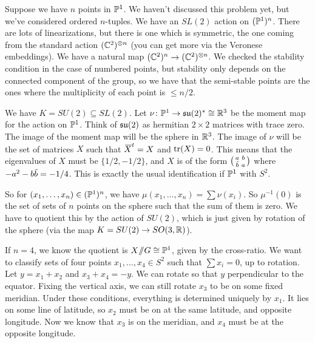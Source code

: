 
\begin{example}
 Suppose we have $n$ points in $\mathbb{P}^1$. We haven't discussed this problem yet, but we've considered ordered $n$-tuples. We have an $SL(2)$ action on $(\mathbb{P}^1)^n$. There are lots of linearizations, but there is one which is symmetric, the one coming from the standard action $(\mathbb{C}^2)^{\otimes n}$ (you can get more via the Veronese embeddings). We have a natural map $(\mathbb{C}^2)^n\to (\mathbb{C}^2)^{\otimes n}$. We checked the stability condition in the case of numbered points, but stability only depends on the connected component of the group, so we have that the semi-stable points are the ones where the multiplicity of each point is $\le n/2$.
 
 We have $K=SU(2)\subseteq SL(2)$. Let $\nu\colon \mathbb{P}^1\to \mathfrak{su}(2)^*\cong \mathbb{R}^3$ be the moment map for the action on $\mathbb{P}^1$. Think of $\mathfrak{su}(2)$ as hermitian $2\times 2$ matrices with trace zero. The image of the moment map will be the sphere in $\mathbb{R}^3$. The image of $\nu$ will be the set of matrices $X$ such that $\bbar X^t=X$ and $\operatorname{tr}(X)=0$. This means that the eigenvalues of $X$ must be $\{1/2,-1/2\}$, and $X$ is of the form $\matx{a&b\\ \bbar b& a}$ where $-a^2-b\bbar b = -1/4$. This is exactly the usual identification if $\mathbb{P}^1$ with $S^2$.
 
 So for $(x_1,\dots, x_n)\in (\mathbb{P}^1)^n$, we have $\mu(x_1,\dots, x_n) = \sum \nu(x_i)$. So $\mu^{-1}(0)$ is the set of sets of $n$ points on the sphere such that the sum of them is zero. We have to quotient this by the action of $SU(2)$, which is just given by rotation of the sphere (via the map $K=SU(2)\to SO(3,\mathbb{R})$).
 
 If $n=4$, we know the quotient is $X\mbox{\rm /\!\!/} G\cong \mathbb{P}^1$, given by the cross-ratio. We want to classify sets of four points $x_1,\dots, x_4\in S^2$ such that $\sum x_i=0$, up to rotation. Let $y=x_1+x_2$ and $x_3+x_4=-y$. We can rotate so that $y$ perpendicular to the equator. Fixing the vertical axis, we can still rotate $x_3$ to be on some fixed meridian. Under these conditions, everything is determined uniquely by $x_1$. It lies on some line of latitude, so $x_2$ must be on at the same latitude, and opposite longitude. Now we know that $x_3$ is on the meridian, and $x_4$ must be at the opposite longitude.
\end{example}


